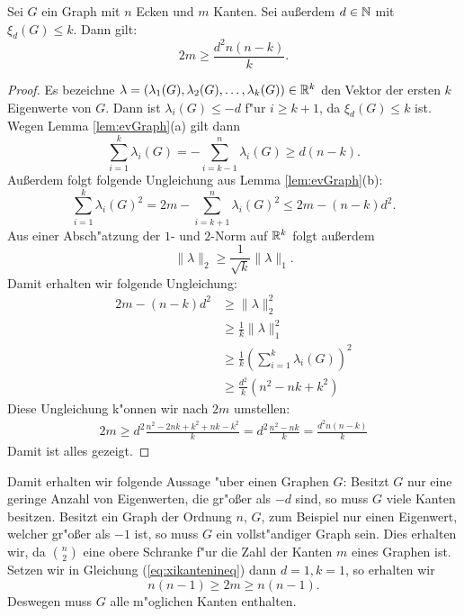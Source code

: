   \begin{theorem}
    Sei $G$ ein Graph mit $n$ Ecken und $m$ Kanten. Sei au{\ss}erdem $d\in {\mathbb{N}}$ mit $\xi_d(G) \leq k$. Dann gilt:
    $$ 2m \geq \frac{d^{2}n(n-k)}{k}.$$
    \label{thm:xikantenschranke}
  \end{theorem}

  \begin{proof}
    Es bezeichne $\lambda = (\lambda_{1}(G),\lambda_{2}(G), \dots , \lambda_{k}(G))\in {\mathbb{R}}^{k}$ den Vektor der ersten $k$ Eigenwerte von $G$. Dann ist $\lambda_{i}(G) \leq -d$ f"ur $i \geq k+1$, da $\xi_{d}(G) \leq k$ ist.
    Wegen Lemma \ref{lem:evGraph}(a) gilt dann 
    $$
    \sum\limits_{i=1}^{k} \lambda_{i}(G) = - \sum\limits_{i=k-1}^{n} \lambda_{i}(G) \geq d(n-k).
    $$
    Au{\ss}erdem folgt folgende Ungleichung aus Lemma \ref{lem:evGraph}(b):
    $$ \sum\limits_{i=1}^{k} \lambda_{i}(G)^{2} = 2m - \sum\limits_{i=k+1}^{n} \lambda_{i}(G) ^{2} \leq 2m - (n-k)d^{2}.$$
    Aus einer Absch"atzung der $1$- und $2$-Norm auf ${\mathbb{R}}^{k}$ folgt au{\ss}erdem 
    $$\| \lambda \|_{2} \geq \frac{1}{\sqrt{k}} \|\lambda\|_{1}.$$
    Damit erhalten wir folgende Ungleichung:
    \begin{align*}
      2m - (n-k)d^{2} &\geq \| \lambda \| _{2}^{2} \\
      & \geq \frac{1}{k} \| \lambda \| _1^{2} \\
      & \geq \frac{1}{k} ( \sum\limits_{i=1}^{k} \lambda_{i}(G))^{2} \\
      & \geq \frac{d^{2}}{k}(n^{2}-nk+k^{2})
    \end{align*}
    Diese Ungleichung k"onnen wir nach $2m$ umstellen:
    \begin{align}
      2m \geq d^{2}\frac{n^{2}-2nk + k^{2}+ nk - k^{2} }{k} = d^{2}\frac{n^{2}-nk}{k} = \frac{d^{2}n(n-k)}{k}
      \label{eq:xikantenineq}
    \end{align}
    Damit ist alles gezeigt. 
  \end{proof}
  Damit erhalten wir folgende Aussage "uber einen Graphen $G$: Besitzt $G$ nur eine geringe Anzahl von Eigenwerten, die gr"o{\ss}er als $-d$ sind, so muss $G$ viele Kanten besitzen. Besitzt ein Graph der Ordnung $n$, $G$, zum Beispiel nur einen Eigenwert, welcher gr"o{\ss}er als $-1$ ist, so muss $G$ ein vollst"andiger Graph sein. 
  Dies erhalten wir, da $\binom{n}{2}$ eine obere Schranke f"ur die Zahl der Kanten $m$ eines Graphen ist. Setzen wir in Gleichung (\ref{eq:xikantenineq}) dann $d=1, k=1$, so erhalten wir 
  \begin{equation*}
    n(n-1) \geq 2m \geq n(n-1).
  \end{equation*}
  Deswegen muss  $G$ alle m"oglichen Kanten enthalten.
